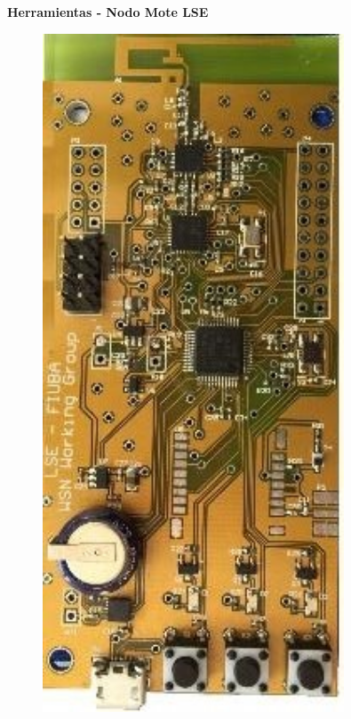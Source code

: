 \documentclass[aspectratio=43, handout]{beamer}
\begin{document}
\begin{frame}{\textbf{\LARGE{Herramientas - Nodo Mote LSE}}}
\begin{minipage}[c]{1.0\linewidth}
\begin{minipage}[c]{0.35\linewidth}
\begin{figure}[H]
			\includegraphics[width=0.8\textwidth]{./imagenes/mote(1).jpg}
		\end{figure}	  	  	
	\end{minipage}
\end{minipage}
\end{frame}

\end{document}
